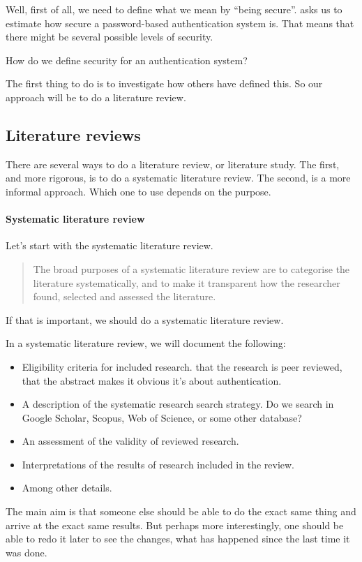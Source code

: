 Well, first of all, we need to define what we mean by \enquote{being secure}.
 asks us to estimate how secure a password-based authentication system 
is.
That means that there might be several possible levels of security.

\begin{frame}[fragile]
  \begin{exercise}
    How do we define security for an authentication system?
  \end{exercise}
\end{frame}

\begin{frame}
  \begin{solution}
    The first thing to do is to investigate how others have defined this.
    So our approach will be to do a literature review.
  \end{solution}
\end{frame}

\subsection{Literature reviews}

There are several ways to do a literature review, or literature study.
The first, and more rigorous, is to do a systematic literature review.
The second, is a more informal approach.
Which one to use depends on the purpose.

\paragraph{Systematic literature review}

Let's start with the systematic literature review.
\blockcquote{ANUSLR}{%
The broad purposes of a systematic literature review are to categorise the 
literature systematically, and to make it transparent how the researcher found, 
selected and assessed the literature.%
}
If that is important, we should do a systematic literature review.

In a systematic literature review, we will document the 
following\autocite{ElsevierSLR}:
\begin{itemize}
  \item Eligibility criteria for included research.
    \Eg that the research is peer reviewed, that the abstract makes it 
    obvious it's about authentication.
  \item A description of the systematic research search strategy.
    Do we search in Google Scholar, Scopus, Web of Science, or some other 
    database?
  \item An assessment of the validity of reviewed research.
  \item Interpretations of the results of research included in the review.
  \item Among other details.
\end{itemize}
The main aim is that someone else should be able to do the exact same thing and 
arrive at the exact same results.
But perhaps more interestingly, one should be able to redo it later to see the 
changes, what has happened since the last time it was done.

